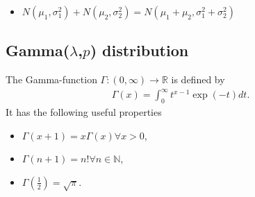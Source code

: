 \documentclass{article}
\begin{document}
	\begin{itemize}
		\item $N\left( \mu_{1},\sigma_{1}^{2}\right) + N\left( \mu_{2},\sigma_{2}^{2}\right) = N\left( \mu_{1}+\mu_{2},\sigma_{1}^{2}+\sigma_{2}^{2}\right)$
	\end{itemize}
	
	\newpage
	
	\subsection{Gamma($\lambda$,$p$) distribution}
	The Gamma-function $\Gamma:\left( 0,\infty \right) \to \mathbb{R}$ is defined by
	\begin{align*}
		\Gamma\left( x\right) = \int_{0}^{\infty}t^{x-1}\exp\left ( -t \right ) dt.
	\end{align*}
	It has the following useful properties
	\begin{itemize}
		\item $\Gamma\left ( x+1 \right )=x\Gamma\left ( x \right ) \forall x>0$,
		\item $\Gamma\left ( n+1 \right )=n! \forall n\in\mathbb{N}$,
		\item $\Gamma\left ( \frac{1}{2} \right )= \sqrt{\pi}$.
	\end{itemize}
	\vspace{4pt}
\end{document}
